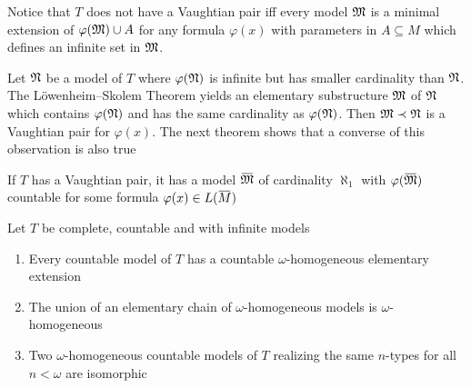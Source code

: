 \documentclass[11pt]{article}
\begin{document}
\begin{remark}
Notice that \(T\) does not have a Vaughtian pair iff every model \(\mathfrak{M}\) is a minimal extension
of \(\varphi(\mathfrak{M})\cup A\) for any formula \(\varphi(x)\) with parameters in \(A\subseteq M\) which defines an infinite
set in \(\mathfrak{M}\).
\end{remark}



Let \(\mathfrak{N}\) be a model of \(T\) where \(\varphi(\mathfrak{N})\) is infinite but has smaller cardinality than \(\mathfrak{N}\).
The Löwenheim–Skolem Theorem yields an elementary substructure \(\mathfrak{M}\) of \(\mathfrak{N}\) which
contains \(\varphi(\mathfrak{N})\) and has the same cardinality as \(\varphi(\mathfrak{N})\). Then \(\mathfrak{M}\prec\mathfrak{N}\) is a Vaughtian pair
for \(\varphi(x)\). The next theorem shows that a converse of this observation is also true

\begin{theorem}
\label{thm5.5.2}
If \(T\) has a Vaughtian pair, it has a model \(\barfM\) of cardinality \(\aleph_1\)
with \(\varphi(\barfM)\) countable for some formula \(\varphi(x)\in L(\barM)\)
\end{theorem}

\begin{lemma}[]
\label{lemma5.5.3}
Let \(T\) be complete, countable and with infinite models
\begin{enumerate}
\item Every countable model of \(T\) has a countable \(\omega\)-homogeneous elementary extension
\item The union of an elementary chain of \(\omega\)-homogeneous models is \(\omega\)-homogeneous
\item Two \(\omega\)-homogeneous countable models of \(T\) realizing the same \(n\)-types for all \(n<\omega\)
are isomorphic
\end{enumerate}
\end{lemma}
\end{document}
